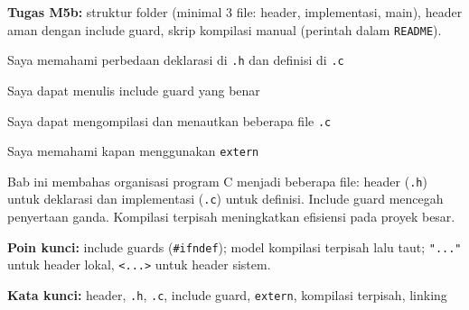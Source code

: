 \documentclass[../main.tex]{subfiles}
\begin{document}
\begin{asesmen}
\textbf{Tugas M5b:} struktur folder (minimal 3 file: header, implementasi, main), header aman dengan include guard, skrip kompilasi manual (perintah dalam \texttt{README}).
\end{asesmen}

\begin{checklist}
  \item Saya memahami perbedaan deklarasi di \texttt{.h} dan definisi di \texttt{.c}
  \item Saya dapat menulis include guard yang benar
  \item Saya dapat mengompilasi dan menautkan beberapa file \texttt{.c}
  \item Saya memahami kapan menggunakan \texttt{extern}
\end{checklist}

\begin{rangkuman}
Bab ini membahas organisasi program C menjadi beberapa file: header (\texttt{.h}) untuk deklarasi dan implementasi (\texttt{.c}) untuk definisi. Include guard mencegah penyertaan ganda. Kompilasi terpisah meningkatkan efisiensi pada proyek besar.

\textbf{Poin kunci:} include guards (\texttt{\#ifndef}); model kompilasi terpisah lalu taut; \texttt{"..."} untuk header lokal, \texttt{<...>} untuk header sistem.

\textbf{Kata kunci:} header, \texttt{.h}, \texttt{.c}, include guard, \texttt{extern}, kompilasi terpisah, linking
\end{rangkuman}
\end{document}
